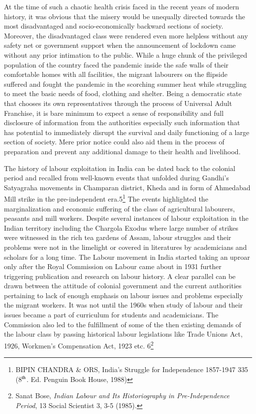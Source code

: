 \begin{multicols}{2}
\noi
At the time of such a chaotic health crisis faced in the recent years of modern history, it was
obvious that the misery would be unequally directed towards the most disadvantaged and socio-economically backward sections of society. Moreover, the disadvantaged class were
rendered even more helpless without any safety net or government support when the
announcement of lockdown came without any prior intimation to the public. While a huge
chunk of the privileged population of the country faced the pandemic inside the safe walls of
their comfortable homes with all facilities, the migrant labourers on the flipside suffered and
fought the pandemic in the scorching summer heat while struggling to meet the basic needs
of food, clothing and shelter. Being a democratic state that chooses its own representatives
through the process of Universal Adult Franchise, it is bare minimum to expect a sense of
responsibility and full disclosure of information from the authorities especially such
information that has potential to immediately disrupt the survival and daily functioning of a
large section of society. Mere prior notice could also aid them in the process of preparation
and prevent any additional damage to their health and livelihood. 


\noi
The history of labour exploitation in India can be dated back to the colonial period and
recalled from well-known events that unfolded during Gandhi’s Satyagraha movements in
Champaran district, Kheda and in form of Ahmedabad Mill strike in the pre-independent era.5\footnote{ BIPIN CHANDRA \& ORS, India's Struggle for Independence 1857-1947 335 (8$^{\rm th}$. Ed. Penguin Book House,
1988)}
 The events highlighted the marginalization and economic suffering of the class of
agricultural labourers, peasants and mill workers. Despite several instances of labour
exploitation in the Indian territory including the Chargola Exodus where large number of
strikes were witnessed in the rich tea gardens of Assam, labour struggles and their problems
were not in the limelight or covered in literatures by academicians and scholars for a long
time. The Labour movement in India started taking an uproar only after the Royal
Commission on Labour came about in 1931 further triggering publication and research on
labour history. A clear parallel can be drawn between the attitude of colonial government and
the current authorities pertaining to lack of enough emphasis on labour issues and problems
especially the migrant workers. It was not until the 1960s when study of labour and their
issues became a part of curriculum for students and academicians. The Commission also led to the fulfillment of some of the then existing demands of the labour class by passing
historical labour legislations like Trade Unions Act, 1926, Workmen’s Compensation Act,
1923 etc. 6\footnote{Sanat Bose, \textit{Indian Labour and Its Historiography in Pre-Independence Period}, 13 Social Scientist 3, 3-5
(1985).}


\end{multicols}
